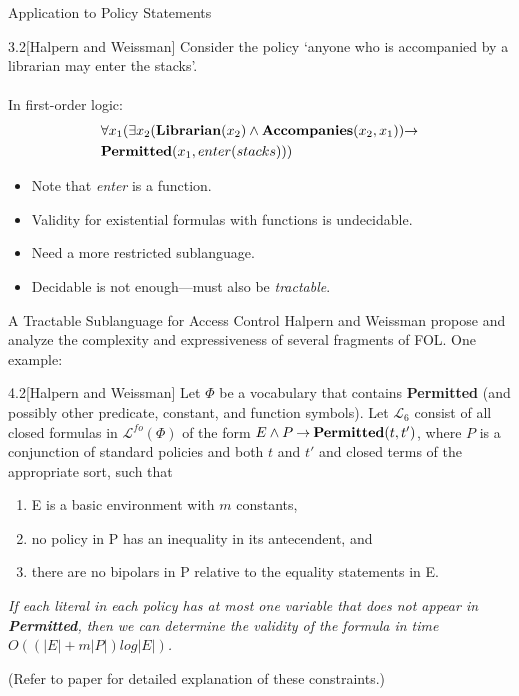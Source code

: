\documentclass[style=sailor,size=12pt]{powerdot}
\begin{document}
\begin{wideslide}[bm=,toc=]{Application to Policy Statements}
\begin{ex}{3.2}[Halpern and Weissman]
Consider the policy `anyone who is accompanied by a librarian
may enter the stacks'.\\~\\
\pause
In first-order logic:
\begin{align*}
& \forall x_1 (\exists x_2 (\mbox{\bf Librarian}(x_2) \land \mbox{\bf Accompanies}(x_2,x_1)) \mathbin{\rightarrow} \\
& \mbox{\bf Permitted}(x_1, enter(stacks)))
\end{align*}
\end{ex}
\begin{itemize} 
\item<3-> Note that \emph{enter} is a function.
\item<4-> Validity for existential formulas with functions is undecidable. 
\item<5-> Need a more restricted sublanguage.
\item<6-> Decidable is not enough---must also be \emph{tractable}.
\end{itemize}
\end{wideslide}

\begin{wideslide}[bm=,toc=]{A Tractable Sublanguage for Access
  Control}
Halpern and Weissman propose and analyze the complexity and expressiveness
of several fragments of FOL. One example:
\pause
\begin{thm}{4.2}[Halpern and Weissman]
Let $\Phi$ be a vocabulary that contains {\bf Permitted} (and possibly
other predicate, constant, and function symbols). Let $\mathcal{L}_6$
consist of all closed formulas in $\mathcal{L}^{fo}(\Phi)$ of the
form $E \land P \mathbin{\rightarrow} \mbox{\bf Permitted}(t,t')$, where $P$ is a conjunction
of standard policies and both $t$ and $t'$ and closed terms of the
appropriate sort, such that
\end{thm}
\vspace{-2ex}
\begin{enumerate}
\renewcommand{\labelenumi}{\alph{enumi})}
\item<3-> E is a basic environment with $m$ constants,
\item<4-> no policy in P has an inequality in its antecendent, and
\item<5-> there are no bipolars in P relative to the equality statements
in E.
\end{enumerate}
\pause[4]
\emph{If each literal in each policy has at most one variable
  that does not appear in {\bf Permitted}, then we can determine
    the validity of the formula in time $O((|E| + m|P|)log|E|)$.}

    {\tiny (Refer to paper for detailed explanation of these constraints.)}
\end{wideslide}
\end{document}
